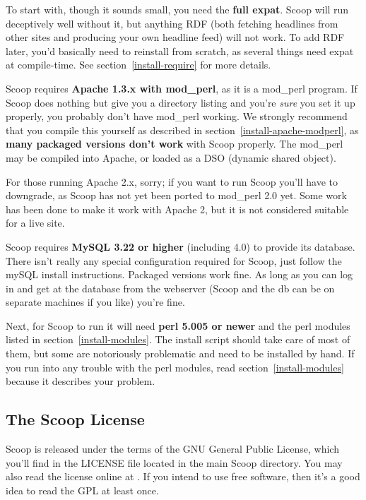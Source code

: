 To start with, though it sounds small, you need the {\bf full expat}.  Scoop will run deceptively well without it, but anything RDF (both fetching headlines from other sites and producing your own headline feed) will not work.  To add RDF later, you'd basically need to reinstall from scratch, as several things need expat at compile-time.  See section~\ref{install-require} for more details.

Scoop requires {\bf Apache 1.3.x with mod\_perl}, as it is a mod\_perl program.  If Scoop does nothing but give you a directory listing and you're {\em sure} you set it up properly, you probably don't have mod\_perl working.  We strongly recommend that you compile this yourself as described in section~\ref{install-apache-modperl}, as {\bf many packaged versions don't work} with Scoop properly.  The mod\_perl may be compiled into Apache, or loaded as a DSO (dynamic shared object).

For those running Apache 2.x, sorry; if you want to run Scoop you'll have to downgrade, as Scoop has not yet been ported to mod\_perl 2.0 yet. Some work has been done to make it work with Apache 2, but it is not considered suitable for a live site.

Scoop requires {\bf MySQL 3.22 or higher} (including 4.0) to provide its database.  There isn't really any special configuration required for Scoop, just follow the mySQL install instructions.  Packaged versions work fine.  As long as you can log in and get at the database from the webserver (Scoop and the db can be on separate machines if you like) you're fine.

Next, for Scoop to run it will need {\bf perl 5.005 or newer} and the perl modules listed in section~\ref{install-modules}.  The install script should take care of most of them, but some are notoriously problematic and need to be installed by hand.  If you run into any trouble with the perl modules, read section~\ref{install-modules} because it describes your problem.

\subsection{The Scoop License}

Scoop is released under the terms of the GNU General Public License, which you'll find in the LICENSE file located in the main Scoop directory. You may also read the license online at . If you intend to use free software, then it's a good idea to read the GPL at least once.

